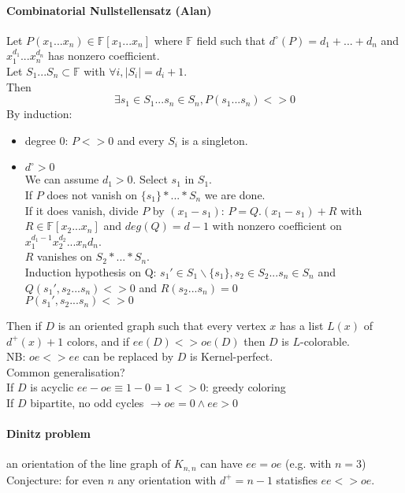 \documentclass[12pt]{article}
\begin{document}
\paragraph{Combinatorial Nullstellensatz (Alan)\\} 
Let $P(x_1 ... x_n) \in \mathbb{F}[x_1 ... x_n]$ where $\mathbb{F}$ field such that $d^{\circ}(P) = d_1 + ... + d_n$ and $x_1^{d_1} ... x_n^{d_n}$ has nonzero coefficient.\\
Let $S_1 ... S_n \subset \mathbb{F}$ with $\forall i, |S_i| = d_i + 1$.\\
Then \[ \exists s_1 \in S_1 ... s_n \in S_n, P(s_1 ... s_n) <> 0 \]
By induction:
\begin{itemize}
\item degree $0$: $P <> 0$ and every $S_i$ is a singleton.
\item $d^\circ > 0$\\
	We can assume $d_1 > 0$. Select $s_1$ in $S_1$.\\
	If $P$ does not vanish on $\{s_1\} * ... * S_n$ we are done.\\
	If it does vanish, divide $P$ by $(x_1 - s_1)$: $P = Q . (x_1 - s_1) + R$ with $R \in \mathbb{F}[x_2 ... x_n]$ and $deg(Q) = d-1$ with nonzero coefficient on $x_1^{d_1 - 1} x_2^{d_2} ... x_n{d_n}$.\\
	$R$ vanishes on $S_2 * ... * S_n$.\\
	Induction hypothesis on Q: $s_1' \in S_1 \backslash \{s_1\}, s_2 \in S_2 ... s_n \in S_n$ and $Q(s_1', s_2 ... s_n) <> 0$ and $R(s_2 ... s_n) = 0$\\
	$P(s_1', s_2 ... s_n) <> 0$\\
\end{itemize}
Then if $D$ is an oriented graph such that every vertex $x$ has a list $L(x)$ of $d^+(x) + 1$ colors, and if $ee(D) <> oe(D)$ then $D$ is $L$-colorable.\\
NB: $oe <> ee$ can be replaced by $D$ is Kernel-perfect.\\
Common generalisation?\\
If $D$ is acyclic $ee-oe \equiv 1-0 = 1 <> 0$: greedy coloring\\
If $D$ bipartite, no odd cycles $\rightarrow oe = 0 \wedge ee > 0$\\

\paragraph{Dinitz problem} an orientation of the line graph of $K_{n,n}$ can have $ee = oe$ (e.g. with $n = 3$)\\
Conjecture: for even $n$ any orientation with $d^+ = n-1$ statisfies $ee <> oe$.\\
\end{document}
